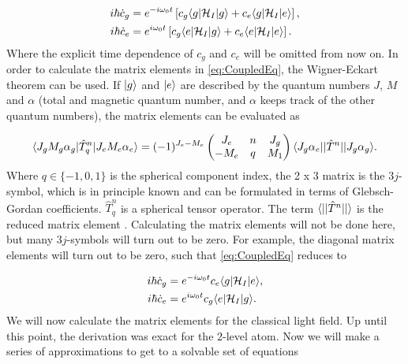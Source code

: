 \begin{subequations}\label{eq:CoupledEq}
	\begin{align}
		i \hbar \dot{c}_g &= e^{-i \omega_0 t} 
		\left[c_g \langle g\rvert \mathcal{H}_I \lvert g\rangle + c_e \langle g\rvert \mathcal{H}_I \lvert e\rangle\right],  \\
		i \hbar \dot{c}_e &=  e^{ i \omega_0 t} 
		\left[c_g \langle e\rvert \mathcal{H}_I \lvert g\rangle + c_e \langle e\rvert \mathcal{H}_I \lvert e\rangle\right].
	\end{align}
\end{subequations}
Where the explicit time dependence of $c_g$ and $c_e$ will be omitted from now on. In order to calculate the matrix elements in \cref{eq:CoupledEq}, the Wigner-Eckart theorem can be used. If $\lvert g\rangle$ and $\lvert e\rangle$ are described by the quantum numbers $J$, $M$ and $\alpha$ (total and magnetic quantum number, and $\alpha$ keeps track of the other quantum numbers), the matrix elements can be evaluated as 

\begin{equation}\label{eq:WignerEckart}
	\langle J_g M_g \alpha_g\rvert \hat{T}_q^n \lvert J_e M_e \alpha_e\rangle = 
	(-1)^{J_e-M_e} \begin{pmatrix}
		J_e & n & J_g \\
		-M_e& q & M_1
	\end{pmatrix}
	\langle J_g\alpha_e \rvert | \hat{T}^n | \lvert J_g\alpha_g\rangle.
\end{equation}
Where $q \in \{-1,0,1\}$ is the spherical component index, the 2 x 3 matrix is the $3j$-symbol, which is in principle known and can be formulated in terms of  Glebsch-Gordan coefficients. $\hat{T}_q^n$ is a spherical tensor operator. The term $\langle\rvert|\hat{T}^n|\lvert\rangle$ is the reduced matrix element \cite{Leeuwen2017}. Calculating the matrix elements will not be done here, but many $3j$-symbols will turn out to be zero. For example, the diagonal matrix elements will turn out to be zero, such that \cref{eq:CoupledEq} reduces to

\begin{subequations}\label{eq:NoOffDiagonal}
	\begin{align}
		i \hbar \dot{c}_g &= e^{-i \omega_0 t}  c_e \langle g\rvert \mathcal{H}_I \lvert e\rangle, \\
		i \hbar \dot{c}_e &=  e^{ i \omega_0 t} c_g \langle e\rvert \mathcal{H}_I \lvert g\rangle  .
	\end{align}
\end{subequations}
We will now calculate the matrix elements for the classical light field. Up until this point, the derivation was exact for the 2-level atom. Now we will make a series of approximations to get to a solvable set of equations \cite{Leeuwen2017}

